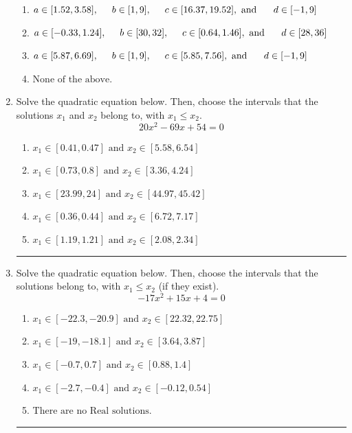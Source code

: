 \documentclass[14pt]{extbook}
\newcommand{\litem}[1]{\item#1\hspace*{-1cm}\rule{\textwidth}{0.4pt}}
\begin{document}
\begin{enumerate}
{\begin{enumerate}[label=\Alph*.]
\item \( a \in [1.52, 3.58], \hspace*{5mm} b \in [1, 9], \hspace*{5mm} c \in [16.37, 19.52], \text{ and } \hspace*{5mm} d \in [-1, 9] \)
\item \( a \in [-0.33, 1.24], \hspace*{5mm} b \in [30, 32], \hspace*{5mm} c \in [0.64, 1.46], \text{ and } \hspace*{5mm} d \in [28, 36] \)
\item \( a \in [5.87, 6.69], \hspace*{5mm} b \in [1, 9], \hspace*{5mm} c \in [5.85, 7.56], \text{ and } \hspace*{5mm} d \in [-1, 9] \)
\item \( \text{None of the above.} \)

\end{enumerate} }
\litem{
Solve the quadratic equation below. Then, choose the intervals that the solutions $x_1$ and $x_2$ belong to, with $x_1 \leq x_2$.\[ 20x^{2} -69 x + 54 = 0 \]\begin{enumerate}[label=\Alph*.]
\item \( x_1 \in [0.41, 0.47] \text{ and } x_2 \in [5.58, 6.54] \)
\item \( x_1 \in [0.73, 0.8] \text{ and } x_2 \in [3.36, 4.24] \)
\item \( x_1 \in [23.99, 24] \text{ and } x_2 \in [44.97, 45.42] \)
\item \( x_1 \in [0.36, 0.44] \text{ and } x_2 \in [6.72, 7.17] \)
\item \( x_1 \in [1.19, 1.21] \text{ and } x_2 \in [2.08, 2.34] \)

\end{enumerate} }
\litem{
Solve the quadratic equation below. Then, choose the intervals that the solutions belong to, with $x_1 \leq x_2$ (if they exist).\[ -17x^{2} +15 x + 4 = 0 \]\begin{enumerate}[label=\Alph*.]
\item \( x_1 \in [-22.3, -20.9] \text{ and } x_2 \in [22.32, 22.75] \)
\item \( x_1 \in [-19, -18.1] \text{ and } x_2 \in [3.64, 3.87] \)
\item \( x_1 \in [-0.7, 0.7] \text{ and } x_2 \in [0.88, 1.4] \)
\item \( x_1 \in [-2.7, -0.4] \text{ and } x_2 \in [-0.12, 0.54] \)
\item \( \text{There are no Real solutions.} \)


\end{enumerate}}
\end{enumerate}
\end{document}
